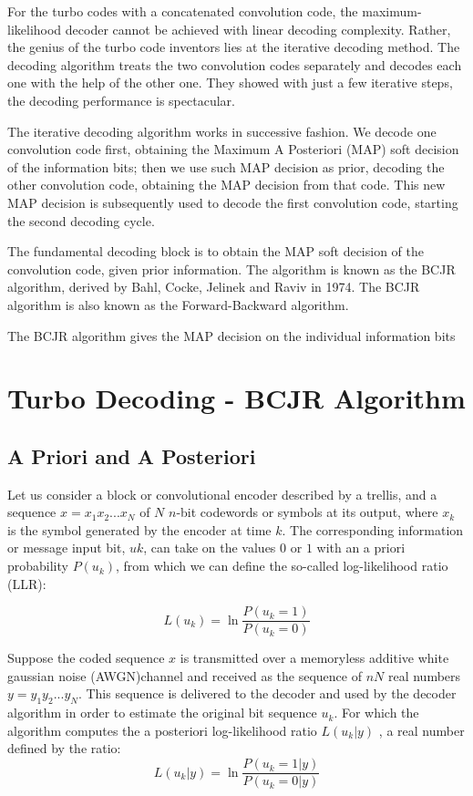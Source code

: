For the turbo codes with a concatenated convolution code, the maximum-likelihood decoder cannot be achieved with linear decoding complexity. Rather, the genius of the turbo code inventors lies at the iterative decoding method. The decoding algorithm treats the two convolution codes separately and decodes each one with the help of the other one. They showed with just a few iterative steps, the decoding performance is spectacular. 


 The iterative decoding algorithm works in successive fashion. We decode one convolution code first, obtaining the Maximum A Posteriori (MAP) soft decision of the information bits; then we use such MAP decision as prior, decoding the other convolution code, obtaining the MAP decision from that code. This new MAP decision is subsequently used to decode the first convolution code, starting the second decoding cycle. 

The fundamental decoding block is to obtain the MAP soft decision of the convolution code, given prior information. The algorithm is known as the BCJR algorithm, derived by Bahl, Cocke, Jelinek and Raviv in 1974. The BCJR algorithm is also known as the Forward-Backward algorithm. 

The BCJR algorithm gives the MAP decision on the individual information bits

\section{Turbo Decoding - BCJR Algorithm}

\subsection{A Priori and A Posteriori}
Let us consider a block or convolutional encoder described by a trellis, and a sequence
\(x = x_1x_2 ...x_N\) of \(N\) \(n\)-bit codewords or symbols at its output, where \(x_k\) is the symbol generated by the
encoder at time \(k\). The corresponding information or message input bit, \(uk\), can take on the values \(0\) or \(1\) with an a priori probability \(P(u_k)\), from which we can define the so-called log-likelihood ratio (LLR):

\begin{equation}
    L(u_k) = \ln \frac{P(u_k=1)}{P(u_k=0)}
\end{equation}

Suppose the coded sequence \(x\) is transmitted over a memoryless additive white gaussian noise
(AWGN)channel and  received as the sequence of \(nN\) real numbers \(y=y_1y_2...y_N\).
This sequence is delivered to the decoder and used by the decoder algorithm in order to estimate the original bit sequence \(u_k\). For which the algorithm computes the a posteriori log-likelihood ratio
\(L(u_k| y)\) , a real number defined by the ratio:
\begin{equation}
    L(u_k|y) = \ln \frac{P(u_k=1|y)}{P(u_k=0|y)}
\end{equation}

